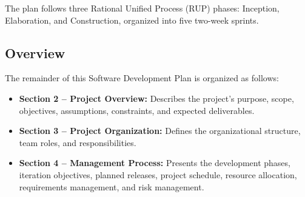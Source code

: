 The plan follows three Rational Unified Process (RUP)
phases: Inception, Elaboration, and Construction,
organized into five two-week sprints.



\subsection{Overview}

The remainder of this Software Development Plan
is organized as follows:

\begin{itemize}

    \item \textbf{Section 2 -- Project Overview:}
    Describes the project's purpose, scope,
    objectives, assumptions, constraints,
    and expected deliverables.

    \item \textbf{Section 3 -- Project Organization:}
    Defines the organizational structure, team roles,
    and responsibilities.

    \item \textbf{Section 4 -- Management Process:}
    Presents the development phases, iteration objectives,
    planned releases, project schedule, resource allocation,
    requirements management, and risk management.
\end{itemize}
